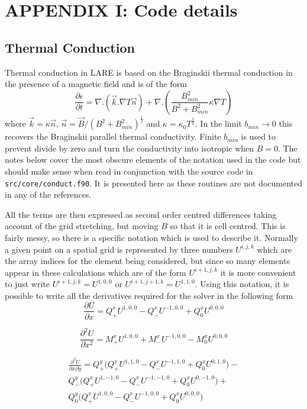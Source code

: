 \documentclass[11pt]{article}
\begin{document}
\newpage
\section*{ APPENDIX I: Code details}
\subsection*{Thermal Conduction} %
\label{sec:thermal_code}  

Thermal conduction in LARE is based on the Braginskii thermal conduction in the presence of a magnetic field and is of the form\\
\[
\frac{\partial \epsilon}{\partial t} = \nabla . \left(\vec{k} . \nabla T \vec{n} \right) +  \nabla . \left(  \frac{B_{min}^2}{B^2+B_{min}^2} \kappa \nabla T \right)
\]
where $\vec{k} = \kappa \vec{n}$, $\vec{n} = \vec{B}/(B^2+B_{min}^2)^\frac{1}{2}$ and $\kappa = \kappa_0  T^\frac{5}{2}$. In the limit $b_{min}\to 0$ this recovers the Braginskii parallel thermal conductivity. Finite $b_{min}$ is used to prevent divide by zero and turn the conductivity into isotropic when $B=0$. The notes below cover the most obscure elements of the notation used in the code but should make sense when read in conjunction with the source code in {\tt src/core/conduct.f90}. It is presented here as these routines are not documented in any of the references.

All the terms are then expressed as second order centred differences taking account of the grid stretching, but moving $B$ so that it is cell centred. This is fairly messy, so there is a specific notation which is used to describe it. Normally a given point on a spatial grid is represented by three numbers $U^{i,j,k}$ which are the array indices for the element being considered, but since so many elements appear in these calculations which are of the form $U^{i+1,j,k}$ it is more convenient to just write $U^{i+1,j,k}=U^{1,0,0}$ or $U^{i+1,j+1,k}=U^{1,1,0}$. Using this notation, it is possible to write all the derivatives required for the solver in the following form\\
\[
\frac{\partial U}{\partial x} = Q^x_+ U^{1,0,0} - Q^x_- U^{-1,0,0} + Q^x_0 U^{0,0,0}    
\]

\[
\frac{\partial^2 U}{\partial x^2} = M^x_+ U^{1,0,0} + M^x_- U^{-1,0,0} - M^x_0 U^{0,0,0}
\]

\begin{eqnarray*}
  \frac{\partial^2 U}{\partial x \partial y} = Q^y_+\bigl(Q^x_+U^{1,1,0} - Q^x_- U^{-1,1,0} + Q^x_0 U^{0,1,0} \bigr) -\\
  Q^y_-\bigl(Q^x_+U^{1,-1,0} - Q^x_- U^{-1,-1,0} + Q^x_0 U^{0,-1,0} \bigr) +\\
  Q^y_0\bigl(Q^x_+U^{1,0,0} - Q^x_- U^{-1,0,0} + Q^x_0 U^{0,0,0} \bigr)  
\end{eqnarray*}
\end{document}
